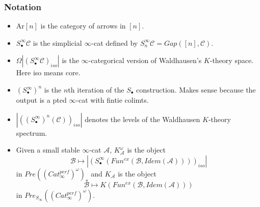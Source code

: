 \documentclass[letterpaper]{article}
\theoremstyle{definition}
\newcommand{\mc}{\mathcal}
\begin{document}
\subsubsection{Notation}
\begin{itemize}
\item Ar$[n]$ is the  category of arrows in $[n]$.

\item $S^\infty_{\bullet} \mc C$  is the  simplicial $\infty$-cat defined by
                                  $S_n^\infty \mc C = Gap([n],\mc
                                  C)$.

\item $\Omega |(S^\infty_{\bullet} \mc C)_{iso}|$  is  the
                                                   $\infty$-categorical
                                                   version of
                                                   Waldhausen's
                                                   $K$-theory
                                                   space. Here iso
                                                   means core. 

\item $(S_{\bullet}^\infty)^n$  is  the $n$th iteration of the
                                $S_{\bullet}$ construction. Makes sense
                                because the output is a pted
                                $\infty$-cat with fintie colimts. 


\item $|((S_{\bullet}^\infty)^n(\mc C))_{iso}|$  denotes  the levels of the
                                                 Waldhausen $K$-theory
                                                 spectrum. 
\item Given a small stable $\infty$-cat $\mc A$, $K^\omega_{\mc A}$
  is the object
\[
\mc B \mapsto |(S_{\bullet}^\infty (Fun^{ex}(\mc B, Idem(\mc A))))_{iso}|
\]
in $Pre((Cat_{\infty}^{perf})^{\omega})_*$ and $K_{\mc A}$ is the
object
\[
\mc B \mapsto K(Fun^{ex}(\mc B,Idem(\mc A)))
\]
in $Pre_{S_{\infty}}((Cat_{\infty}^{perf})^{\omega})$. 
\end{itemize}
\end{document}
